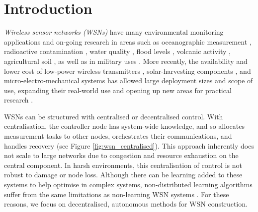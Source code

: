 \section{Introduction}

\ifdefined\DEBUG {} \else \fi
\textit{Wireless sensor networks (WSNs)} have many environmental monitoring applications and on-going research in areas such as oceanographic measurement \citep{Mahdy2008a, Albaladejo2010, 6973877}, radioactive contamination \citep{Gomez2015}, water quality \citep{Fang2010}, flood levels \citep{Castillo-effen2004}, volcanic activity \citep{Werner-Allen2006}, agricultural soil \citep{8745854}, as well as in military uses \citep{6268958}. More recently, the availability and lower cost of low-power wireless transmitters \citep{902661}, solar-harvesting components \citep{Prauzek2018}, and micro-electro-mechanical systems \citep{1045391} has allowed large deployment sizes and scope of use, expanding their real-world use and opening up new areas for practical research \citep{5597912, Kandris2020}.

\ifdefined\DEBUG {} \else \fi
\ifdefined\DEBUG {} \else \fi
WSNs can be structured with centralised or decentralised control. With centralisation, the controller node has system-wide knowledge, and so allocates measurement tasks to other nodes, orchestrates their communications, and handles recovery (see Figure \ref{fig:wsn_centralised}). This approach inherently does not scale to large networks due to congestion and resource exhaustion on the central component. In harsh environments, this centralisation of control is not robust to damage or node loss. Although there can be learning added to these systems to help optimise in complex systems, non-distributed learning algorithms suffer from the same limitations as non-learning WSN systems \citep{Imagestate2006}. For these reasons, we focus on decentralised, autonomous methods for WSN construction.

